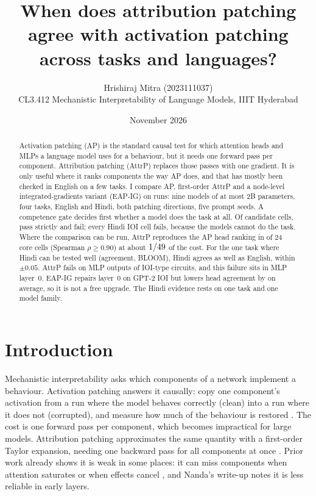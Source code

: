 \documentclass[10pt,a4paper]{article}
\title{When does attribution patching agree with activation patching\\ across tasks and languages?}
\author{Hrishiraj Mitra (2023111037)\\ CL3.412 Mechanistic Interpretability of Language Models, IIIT Hyderabad}
\date{November 2026}
\begin{document}
\maketitle

\begin{abstract}
Activation patching (AP) is the standard causal test for which attention heads and MLPs a language model uses for a behaviour, but it needs one forward pass per component. Attribution patching (AttrP) replaces those passes with one gradient. It is only useful where it ranks components the way AP does, and that has mostly been checked in English on a few tasks. I compare AP, first-order AttrP and a node-level integrated-gradients variant (EAP-IG) on \NRuns{} runs: nine models of at most 2B parameters, four tasks, English and Hindi, both patching directions, five prompt seeds. A competence gate decides first whether a model does the task at all. Of \NGateCells{} candidate cells, \NStrict{} pass strictly and \NFail{} fail; every Hindi IOI cell fails, because the models cannot do the task. Where the comparison can be run, AttrP reproduces the AP head ranking in \HOnePass{} of 24 core cells (Spearman $\rho\ge0.90$) at about $1/49$ of the cost. For the one task where Hindi can be tested well (agreement, BLOOM), Hindi agrees as well as English, within $\pm0.05$. AttrP fails on MLP outputs of IOI-type circuits, and this failure sits in MLP layer~0. EAP-IG repairs layer~0 on GPT-2 IOI but lowers head agreement by \HFiveHeadGain{} on average, so it is not a free upgrade. The Hindi evidence rests on one task and one model family.
\end{abstract}

\section{Introduction}
Mechanistic interpretability asks which components of a network implement a behaviour. Activation patching answers it causally: copy one component's activation from a run where the model behaves correctly (clean) into a run where it does not (corrupted), and measure how much of the behaviour is restored \citep{heimersheim2024patching,zhang2023bestpractices}. The cost is one forward pass per component, which becomes impractical for large models. Attribution patching approximates the same quantity with a first-order Taylor expansion, needing one backward pass for all components at once \citep{nanda2023attribution,syed2023attribution}. Prior work already shows it is weak in some places: it can miss components when attention saturates or when effects cancel \citep{kramar2024atp}, and Nanda's write-up notes it is less reliable in early layers.
\end{document}
